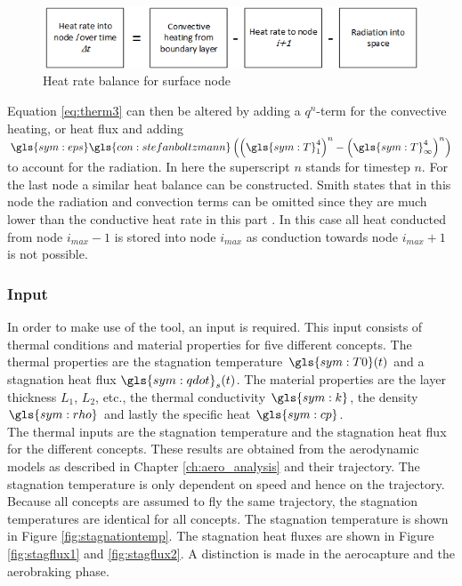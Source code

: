 \begin{figure}[H]
	\centering
	\includegraphics{Figure/thermblocknode2.png}
	\caption[Heat rate balance for surface node]{Heat rate balance for surface node \cite{Smith2011}}
	\label{fig:thermbalance2}
\end{figure}

Equation \eqref{eq:therm3} can then be altered by adding a $q^n$-term for the convective heating, or heat flux and adding  $\gls{sym:eps}\gls{con:stefanboltzmann}\left(\left(\gls{sym:T}_1^4\right)^n-\left(\gls{sym:T}_\infty^4\right)^n\right)$ to account for the radiation. In here the superscript $n$ stands for timestep $n$. For the last node a similar heat balance can be constructed. Smith states that in this node the radiation and convection terms can be omitted since they are much lower than the conductive heat rate in this part \cite{Smith2011}. In this case all heat conducted from node $i_{max}-1$ is stored into node $i_{max}$ as conduction towards node $i_{max}+1$ is not possible.


\subsubsection{Input}
In order to make use of the tool, an input is required. This input consists of thermal conditions and material properties for five different concepts. The thermal properties are the stagnation temperature $ \gls{sym:T0}(t) $ and a stagnation heat flux $ \gls{sym:qdot}_s(t) $. The material properties are the layer thickness $ L_1 $, $ L_2 $, etc., the thermal conductivity $ \gls{sym:k} $, the density $ \gls{sym:rho} $ and lastly the specific heat $ \gls{sym:cp} $.\\

The thermal inputs are the stagnation temperature and the stagnation heat flux for the different concepts. These results are obtained from the aerodynamic models as described in Chapter \ref{ch:aero_analysis} and their trajectory. The stagnation temperature is only dependent on speed and hence on the trajectory. Because all concepts are assumed to fly the same trajectory, the stagnation temperatures are identical for all concepts. The stagnation temperature is shown in Figure \ref{fig:stagnationtemp}. The stagnation heat fluxes are shown in Figure \ref{fig:stagflux1} and \ref{fig:stagflux2}. A distinction is made in the aerocapture and the aerobraking phase.  \\


